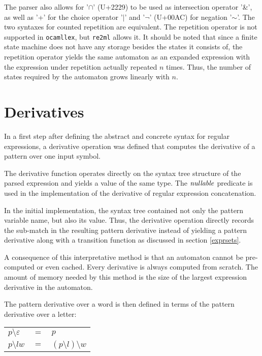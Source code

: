 The parser also allows for '$\cap$' (U+2229) to be used as intersection operator
'\&', as well as '+' for the choice operator '$|$' and '$\neg$' (U+00AC) for
negation '$\sim$'. The two syntaxes for counted repetition are equivalent.  The
repetition operator is not supported in \texttt{ocamllex}, but \texttt{re2ml}
allows it. It should be noted that since a finite state machine does not have
any storage besides the states it consists of, the repetition operator yields
the same automaton as an expanded expression with the expression under
repetition actually repeated $n$ times.  Thus, the number of states required by
the automaton grows linearly with $n$.


\section{Derivatives}

In a first step after defining the abstract and concrete syntax for regular
expressions, a derivative operation was defined that computes the derivative of
a pattern over one input symbol.

The derivative function operates directly on the syntax tree structure of the
parsed expression and yields a value of the same type. The $\mathit{nullable}$ predicate
is used in the implementation of the derivative of regular expression
concatenation.

In the initial implementation, the syntax tree contained not only the pattern
variable name, but also its value. Thus, the derivative operation directly
records the sub-match in the resulting pattern derivative instead of yielding a
pattern derivative along with a transition function as discussed in section
\ref{exprsets}.

A consequence of this interpretative method is that an automaton cannot be
pre-computed or even cached. Every derivative is always computed from scratch.
The amount of memory needed by this method is the size of the largest expression
derivative in the automaton.

The pattern derivative over a word is then defined in terms of the pattern
derivative over a letter:

\begin{tabular}{lrl}
   $p \setminus \varepsilon$	& $=$ & $p$				\\
   $p \setminus lw$		& $=$ & $(p \setminus l) \setminus w$	\\
\end{tabular}

